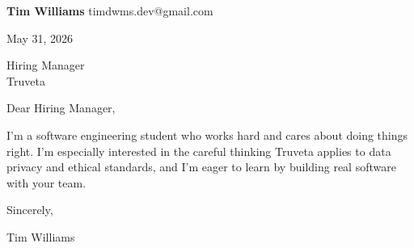 \documentclass[12pt]{article}
\begin{document}
\textbf{Tim Williams} \hfill timdwms.dev@gmail.com

\vspace{1em}

May 31, 2026

\vspace{1em}

Hiring Manager \\
Truveta

\vspace{1em}

Dear Hiring Manager,

I'm a software engineering student who works hard and cares about doing things right. I'm especially interested in the careful thinking Truveta applies to data privacy and ethical standards, and I'm eager to learn by building real software with your team.

\vspace{1em}

Sincerely,

\vspace{2em}

Tim Williams
\end{document}
